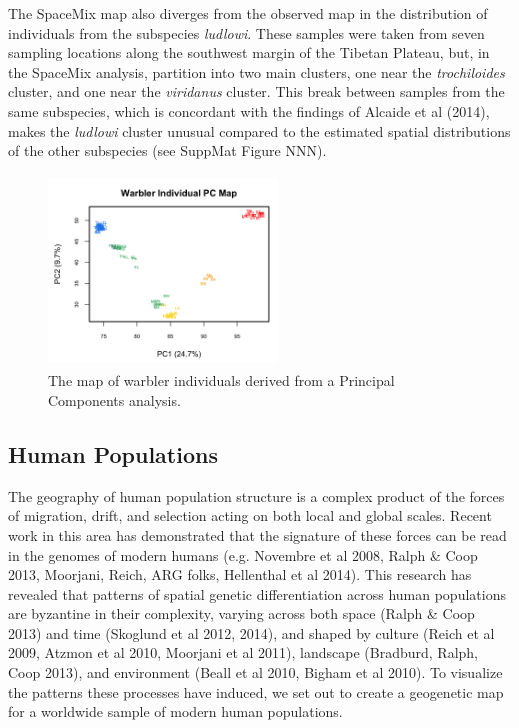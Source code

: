 \documentclass[12pt]{article}
\begin{document}
The SpaceMix map also diverges from the observed map in the distribution of individuals from the subspecies \textit{ludlowi}.  These samples were taken from seven sampling locations along the southwest margin of the Tibetan Plateau, but, in the SpaceMix analysis, partition into two main clusters, one near the \textit{trochiloides} cluster, and one near the \textit{viridanus} cluster.  This break between samples from the same subspecies, which is concordant with the findings of Alcaide et al (2014), makes the \textit{ludlowi} cluster unusual compared to the estimated spatial distributions of the other subspecies (see SuppMat Figure NNN).

\begin{figure}
	\centering
	\includegraphics[width=2.4in,height=2in]{figs/warb_ind_PC_map.png}
	\caption{The map of warbler individuals derived from a Principal Components analysis.}\label{warb_ind_PC_map}
\end{figure}

%
\newpage
\subsection*{Human Populations}
The geography of human population structure is a complex product of the forces of migration, drift, and selection acting on both local and global scales.  Recent work in this area has demonstrated that the signature of these forces can be read in the genomes of modern humans (e.g. Novembre et al 2008, Ralph \& Coop 2013, Moorjani, Reich, ARG folks, Hellenthal et al 2014).  This research has revealed that patterns of spatial genetic differentiation across human populations are byzantine in their complexity, varying across both space (Ralph \& Coop 2013) and time (Skoglund et al 2012, 2014), and shaped by culture (Reich et al 2009, Atzmon et al 2010, Moorjani et al 2011), landscape (Bradburd, Ralph, Coop 2013), and environment (Beall et al 2010, Bigham et al 2010).  To visualize the patterns these processes have induced, we set out to create a geogenetic map for a worldwide sample of modern human populations.  
\end{document}
